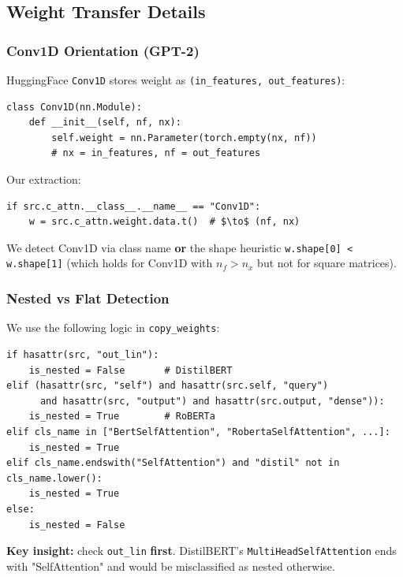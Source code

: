 \subsection{Weight Transfer Details}

\subsubsection{Conv1D Orientation (GPT-2)}

HuggingFace \texttt{Conv1D} stores weight as \texttt{(in\_features, out\_features)}:

\begin{lstlisting}
class Conv1D(nn.Module):
    def __init__(self, nf, nx):
        self.weight = nn.Parameter(torch.empty(nx, nf))
        # nx = in_features, nf = out_features
\end{lstlisting}

Our extraction:

\begin{lstlisting}
if src.c_attn.__class__.__name__ == "Conv1D":
    w = src.c_attn.weight.data.t()  # $\to$ (nf, nx)
\end{lstlisting}

We detect Conv1D via class name \textbf{or} the shape heuristic 
\texttt{w.shape[0] < w.shape[1]} (which holds for Conv1D with $n_f > n_x$ but 
not for square matrices).

\subsubsection{Nested vs Flat Detection}

We use the following logic in \texttt{copy\_weights}:

\begin{lstlisting}
if hasattr(src, "out_lin"):
    is_nested = False       # DistilBERT
elif (hasattr(src, "self") and hasattr(src.self, "query")
      and hasattr(src, "output") and hasattr(src.output, "dense")):
    is_nested = True        # RoBERTa
elif cls_name in ["BertSelfAttention", "RobertaSelfAttention", ...]:
    is_nested = True
elif cls_name.endswith("SelfAttention") and "distil" not in cls_name.lower():
    is_nested = True
else:
    is_nested = False
\end{lstlisting}

\textbf{Key insight:} check \texttt{out\_lin} \textbf{first}. DistilBERT's 
\texttt{MultiHeadSelfAttention} ends with "SelfAttention" and would be misclassified 
as nested otherwise.

